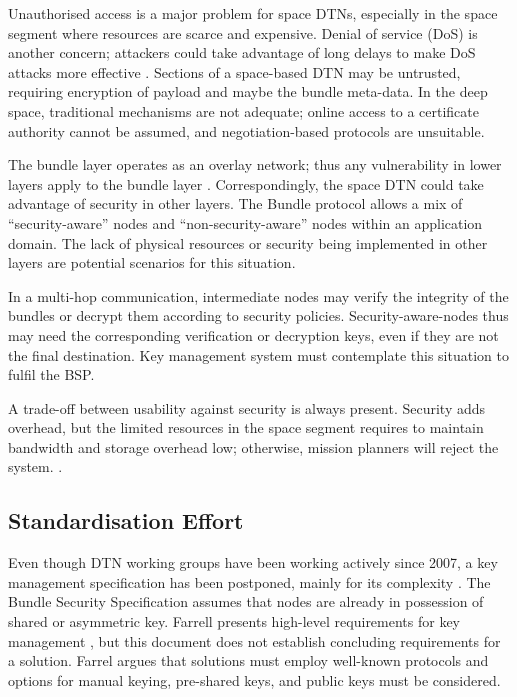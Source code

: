 Unauthorised access is a major problem for space DTNs, especially in the space segment where resources are scarce and expensive. Denial of service (DoS) is another concern; attackers could take advantage of long delays to make DoS attacks more effective \cite{rfc6257}. Sections of a space-based DTN may be untrusted, requiring encryption of payload and maybe the bundle meta-data. In the deep space, traditional mechanisms are not adequate; online access to a certificate authority cannot be assumed, and negotiation-based protocols are unsuitable.
 
 
The bundle layer operates as an overlay network; thus any vulnerability in lower layers apply to the bundle layer \cite{rfc6257}. Correspondingly, the space DTN could take advantage of security in other layers. The Bundle protocol allows a mix of ``security-aware'' nodes and ``non-security-aware'' nodes within an application domain. The lack of physical resources or security being implemented in other layers are potential scenarios for this situation. 

In a multi-hop communication, intermediate nodes may verify the integrity of the bundles or decrypt them according to security policies. Security-aware-nodes thus may need the corresponding verification or decryption keys, even if they are not the final destination. Key management system must contemplate this situation to fulfil the BSP.

A trade-off between usability against security is always present. Security adds overhead, but the limited resources in the space segment requires to maintain bandwidth and storage overhead low; otherwise, mission planners will reject the system. \cite{book2012architecture}.


\subsection{Standardisation Effort}

Even though DTN working groups have been working actively since 2007, a key management specification has been postponed, mainly for its complexity \cite{rfc6257,irtf-dtnrg-sec-overview-06,templin-dtnskmps-00}. The Bundle Security Specification assumes that nodes are already in possession of shared or asymmetric key. Farrell presents high-level requirements for key management \cite{farrell-dtnrg-km-00}, but this document does not establish concluding requirements for a solution. Farrel argues that solutions must employ well-known protocols and options for manual keying, pre-shared keys, and public keys must be considered. 

